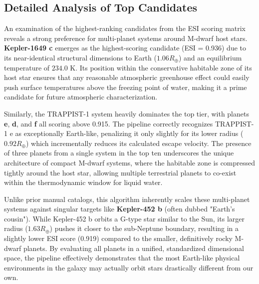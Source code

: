 \documentclass[conference]{IEEEtran}
\begin{document}
\subsection{Detailed Analysis of Top Candidates}
An examination of the highest-ranking candidates from the ESI scoring matrix reveals a strong preference for multi-planet systems around M-dwarf host stars. \textbf{Kepler-1649 c} emerges as the highest-scoring candidate (ESI = 0.936) due to its near-identical structural dimensions to Earth ($1.06 R_\oplus$) and an equilibrium temperature of $234.0$ K. Its position within the conservative habitable zone of its host star ensures that any reasonable atmospheric greenhouse effect could easily push surface temperatures above the freezing point of water, making it a prime candidate for future atmospheric characterization.

Similarly, the TRAPPIST-1 system heavily dominates the top tier, with planets \textbf{e}, \textbf{d}, and \textbf{f} all scoring above 0.915. The pipeline correctly recognizes TRAPPIST-1 e as exceptionally Earth-like, penalizing it only slightly for its lower radius ($0.92 R_\oplus$) which incrementally reduces its calculated escape velocity. The presence of three planets from a single system in the top ten underscores the unique architecture of compact M-dwarf systems, where the habitable zone is compressed tightly around the host star, allowing multiple terrestrial planets to co-exist within the thermodynamic window for liquid water. 

Unlike prior manual catalogs, this algorithm inherently scales these multi-planet systems against singular targets like \textbf{Kepler-452 b} (often dubbed "Earth's cousin"). While Kepler-452 b orbits a G-type star similar to the Sun, its larger radius ($1.63 R_\oplus$) pushes it closer to the sub-Neptune boundary, resulting in a slightly lower ESI score (0.919) compared to the smaller, definitively rocky M-dwarf planets. By evaluating all planets in a unified, standardized dimensional space, the pipeline effectively demonstrates that the most Earth-like physical environments in the galaxy may actually orbit stars drastically different from our own.
\end{document}
